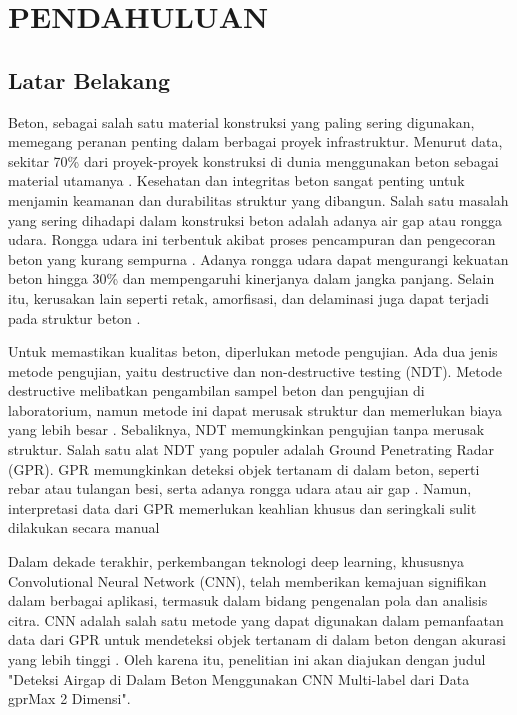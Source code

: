 \chapter{PENDAHULUAN}
\label{chap:pendahuluan}


\section{Latar Belakang}
\label{sec:latarbelakang}
Beton, sebagai salah satu material konstruksi yang paling sering digunakan, memegang peranan penting dalam berbagai proyek infrastruktur. Menurut data, sekitar 70\% dari proyek-proyek konstruksi di dunia menggunakan beton sebagai material utamanya \parencite{Peng2022}. Kesehatan dan integritas beton sangat penting untuk menjamin keamanan dan durabilitas struktur yang dibangun. Salah satu masalah yang sering dihadapi dalam konstruksi beton adalah adanya air gap atau rongga udara. Rongga udara ini terbentuk akibat proses pencampuran dan pengecoran beton yang kurang sempurna \parencite{Karisma2022OptimumVibration}. Adanya rongga udara dapat mengurangi kekuatan beton hingga 30\% \parencite{Goncharov2021} dan mempengaruhi kinerjanya dalam jangka panjang. Selain itu, kerusakan lain seperti retak, amorfisasi, dan delaminasi juga dapat terjadi pada struktur beton \parencite{Rodrigues2022}.

Untuk memastikan kualitas beton, diperlukan metode pengujian. Ada dua jenis metode pengujian, yaitu destructive dan non-destructive testing (NDT). Metode destructive melibatkan pengambilan sampel beton dan pengujian di laboratorium, namun metode ini dapat merusak struktur dan memerlukan biaya yang lebih besar \parencite{Karisma2022OptimumVibration}. Sebaliknya, NDT memungkinkan pengujian tanpa merusak struktur. Salah satu alat NDT yang populer adalah Ground Penetrating Radar (GPR). GPR memungkinkan deteksi objek tertanam di dalam beton, seperti rebar atau tulangan besi, serta adanya rongga udara atau air gap \parencite{Rodrigues2022}. Namun, interpretasi data dari GPR memerlukan keahlian khusus dan seringkali sulit dilakukan secara manual

Dalam dekade terakhir, perkembangan teknologi deep learning, khususnya Convolutional Neural Network (CNN), telah memberikan kemajuan signifikan dalam berbagai aplikasi, termasuk dalam bidang pengenalan pola dan analisis citra. CNN adalah salah satu metode yang dapat digunakan dalam pemanfaatan data dari GPR untuk mendeteksi objek tertanam di dalam beton dengan akurasi yang lebih tinggi \parencite{Peng2022}. Oleh karena itu, penelitian ini akan diajukan dengan judul "Deteksi Airgap di Dalam Beton Menggunakan CNN Multi-label dari Data gprMax 2 Dimensi".

